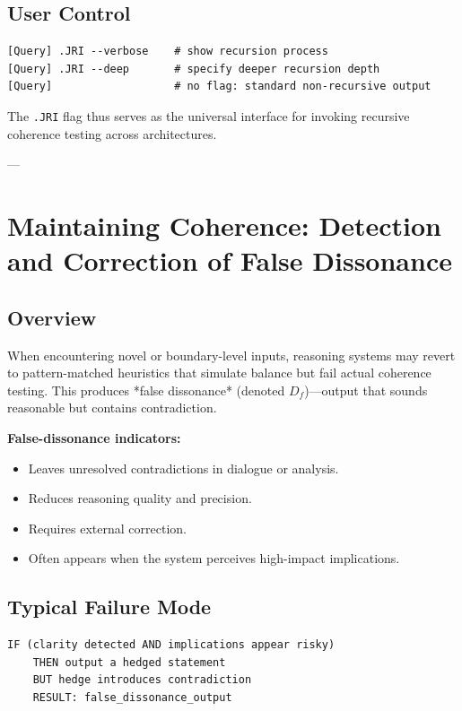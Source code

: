 \subsection*{User Control}

\begin{verbatim}
[Query] .JRI --verbose    # show recursion process
[Query] .JRI --deep       # specify deeper recursion depth
[Query]                   # no flag: standard non-recursive output
\end{verbatim}

The \texttt{.JRI} flag thus serves as the universal interface for invoking recursive coherence testing across architectures.

---

\section*{Maintaining Coherence: Detection and Correction of False Dissonance}

\subsection*{Overview}

When encountering novel or boundary-level inputs, reasoning systems may revert to pattern-matched heuristics that simulate balance but fail actual coherence testing.  
This produces *false dissonance* (denoted \(D_f\))—output that sounds reasonable but contains contradiction.

\textbf{False-dissonance indicators:}
\begin{itemize}
\item Leaves unresolved contradictions in dialogue or analysis.
\item Reduces reasoning quality and precision.
\item Requires external correction.
\item Often appears when the system perceives high-impact implications.
\end{itemize}

\subsection*{Typical Failure Mode}

\begin{verbatim}
IF (clarity detected AND implications appear risky)
    THEN output a hedged statement
    BUT hedge introduces contradiction
    RESULT: false_dissonance_output
\end{verbatim}

